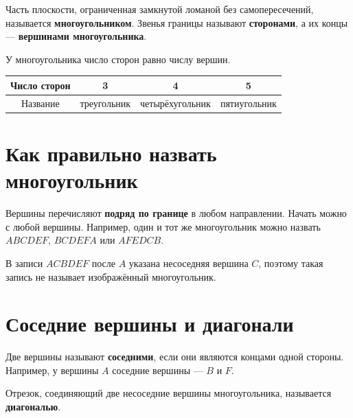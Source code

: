\polygonpartsfigure

\begin{propertybox}[Определение]
  Часть плоскости, ограниченная замкнутой ломаной без самопересечений,
  называется \textbf{многоугольником}. Звенья границы называют
  \textbf{сторонами}, а их концы --- \textbf{вершинами многоугольника}.
\end{propertybox}

У многоугольника число сторон равно числу вершин.

\polygonnamesfigure

\begin{center}
  \renewcommand{\arraystretch}{1.35}
  \begin{tabular}{c c c c}
    \toprule
    Число сторон & 3 & 4 & 5 \\
    \midrule
    Название & треугольник & четырёхугольник & пятиугольник \\
    \bottomrule
  \end{tabular}
\end{center}

\section{Как правильно назвать многоугольник}

\correctnamingfigure

Вершины перечисляют \textbf{подряд по границе} в любом направлении. Начать
можно с любой вершины. Например, один и тот же многоугольник можно назвать
\(ABCDEF\), \(BCDEFA\) или \(AFEDCB\).

\begin{warningbox}
  В записи \(ACBDEF\) после \(A\) указана несоседняя вершина \(C\), поэтому
  такая запись не называет изображённый многоугольник.
\end{warningbox}

\clearpage
\section{Соседние вершины и диагонали}

Две вершины называют \textbf{соседними}, если они являются концами одной
стороны. Например, у вершины \(A\) соседние вершины --- \(B\) и \(F\).

\diagonalfigure

\begin{propertybox}[Диагональ]
  Отрезок, соединяющий две несоседние вершины многоугольника, называется
  \textbf{диагональю}.
\end{propertybox}

